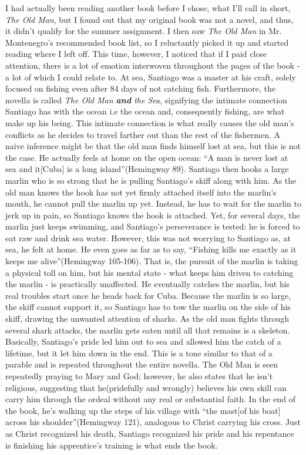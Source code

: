 \documentclass[11pt]{scrartcl}
\begin{document}
\begin{spacing}{2}
I had actually been reading another book before I chose, what I'll call in short, \textit{The Old Man}, but I found out that my original book was not a novel, and thus, it didn't qualify for the summer assignment. I then saw \textit{The Old Man} in Mr. Montenegro's recommended book list, so I reluctantly picked it up and started reading where I left off. This time, however, I noticed that if I paid close attention, there is a lot of emotion interwoven throughout the pages of the book - a lot of which I could relate to. At sea, Santiago was a master at his craft, solely focused on fishing even after 84 days of not catching fish. Furthermore, the novella is called \textit{The Old Man \textbf{and} the Sea}, signifying the intimate connection Santiago has with the ocean i.e the ocean and, consequently fishing, are what make up his being. This intimate connection is what really causes the old man's conflicts as he decides to travel farther out than the rest of the fishermen. A naive inference might be that the old man finds himself lost at sea, but this is not the case. He actually feels at home on the open ocean: ``A man is never lost at sea and it[Cuba] is a long island''(Hemingway 89). Santiago then hooks a large marlin who is so strong that he is pulling Santiago's skiff along with him. As the old man knows the hook has not yet firmly attached itself into the marlin's mouth, he cannot pull the marlin up yet. Instead, he has to wait for the marlin to jerk up in pain, so Santiago knows the hook is attached. Yet, for several days, the marlin just keeps swimming, and Santiago's perseverance is tested: he is forced to eat raw and drink sea water. However, this was not worrying to Santiago as, at sea, he felt at home. He even goes as far as to say, ``Fishing kills me exactly as it keeps me alive''(Hemingway 105-106). That is, the pursuit of the marlin is taking a physical toll on him, but his mental state - what keeps him driven to catching the marlin - is practically unaffected. He eventually catches the marlin, but his real troubles start once he heads back for Cuba. Because the marlin is so large, the skiff cannot support it, so Santiago has to tow the marlin on the side of his skiff, drawing the unwanted attention of sharks. As the old man fights through several shark attacks, the marlin gets eaten until all that remains is a skeleton. Basically, Santiago's pride led him out to sea and allowed him the catch of a lifetime, but it let him down in the end. This is a tone similar to that of a parable and is repeated throughout the entire novella. The Old Man is seen repeatedly praying to Mary and God; however, he also states that he isn't religious, suggesting that he(pridefully and wrongly) believes his own skill can carry him through the ordeal without any real or substantial faith. In the end of the book, he's walking up the steps of his village with ``the mast[of his boat] across his shoulder''(Hemingway 121), analogous to Christ carrying his cross. Just as Christ recognized his death, Santiago recognized his pride and his repentance is finishing his apprentice's training is what ends the book.



\end{spacing}
\end{document}
